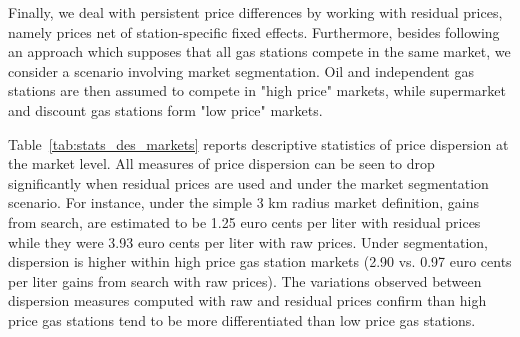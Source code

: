 \documentclass[english]{article}
\begin{document}
Finally, we deal with persistent price differences by working with residual prices, namely prices net of station-specific fixed effects. Furthermore, besides following an approach which supposes that all gas stations compete in the same market, we consider a scenario involving market segmentation. Oil and independent gas stations are then assumed to compete in "high price" markets, while supermarket and discount gas stations form "low price" markets.

Table~\ref{tab:stats_des_markets} reports descriptive statistics of price dispersion at the market level. All measures of price dispersion can be seen to drop significantly when residual prices are used and under the market segmentation scenario. For instance, under the simple 3 km radius market definition, gains from search, are estimated to be 1.25 euro cents per liter with residual prices while they were 3.93 euro cents per liter with raw prices. Under segmentation, dispersion is higher within high price gas station markets (2.90 vs. 0.97 euro cents per liter gains from search with raw prices). The variations observed between dispersion measures computed with raw and residual prices confirm than high price gas stations tend to be more differentiated than low price gas stations.
\end{document}
